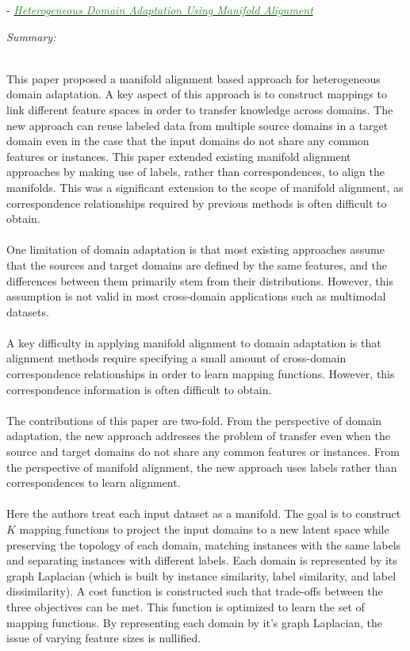 \documentclass[]{article}
\newcommand{\paperentry}[4]{
            \hangindent=1cm
            \textcolor{red}{\cite{#1}} - \href{run:../References/#3}{\textcolor{ForestGreen}{\textit{#2}}}
            
            \noindent            
            \begin{minipage}[t]{0.1\linewidth}\hfill\end{minipage}
            \begin{minipage}[t]{0.8\linewidth}\textcolor{NavyBlue}{{\textit{Summary:}}}#4\end{minipage}
            \vspace{.25cm}
          }
\begin{document}
		\paperentry{Wang2011HeteroDomainAdaptationManAlignment}
		{Heterogeneous Domain Adaptation Using Manifold Alignment}
		{Manifold_Representation_Learning/Alignment/Wang2011HeteroDomainAdaptationManAlignment.pdf}
		{} \\
		This paper proposed a manifold alignment based approach for heterogeneous domain adaptation.  A key aspect of this approach is to construct mappings to link different feature spaces in order to transfer knowledge across domains.  The new approach can reuse labeled data from multiple source domains in a target domain even in the case that the input domains do not share any common features or instances.  This paper extended existing manifold alignment approaches by making use of labels, rather than correspondences, to align the manifolds.  This was a significant extension to the scope of manifold alignment, as correspondence relationships required by previous methods is often difficult to obtain. \\ \\
		One limitation of domain adaptation is that most existing approaches assume that the sources and target domains are defined by the same features, and the differences between them primarily stem from their distributions.  However, this assumption is not valid in most cross-domain applications such as multimodal datasets.
		\\ \\
		A key difficulty in applying manifold alignment to domain adaptation is that alignment methods require specifying a small amount of cross-domain correspondence relationships in order to learn mapping functions.  However, this correspondence information is often difficult to obtain.
		\\ \\
		The contributions of this paper are two-fold.  From the perspective of domain adaptation, the new approach addresses the problem of transfer even when the source and target domains do not share any common features or instances.  From the perspective of manifold alignment, the new  approach uses labels rather than correspondences to learn alignment.
		\\ \\
		Here the authors treat each input dataset as a manifold.  The goal is to construct $K$ mapping functions to project the input domains to a new latent space while preserving the topology of each domain, matching instances with the same labels and separating instances with different labels.  Each domain is represented by its graph Laplacian (which is built by instance similarity, label similarity, and label dissimilarity).  A cost function is constructed such that trade-offs between the three objectives can be met.  This function is optimized to learn the set of mapping functions. By representing each domain by it's graph Laplacian, the issue of varying feature sizes is nullified. \\
		
\end{document}
